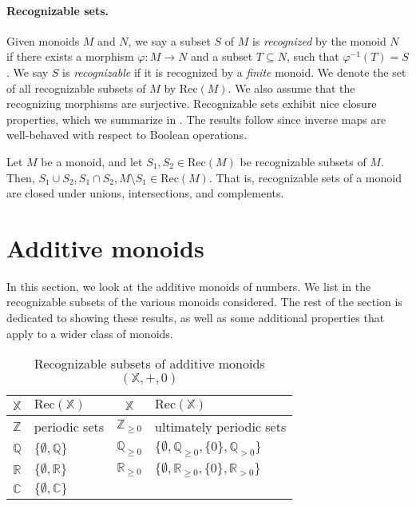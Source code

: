 \documentclass{llncs}
\begin{document}
\paragraph*{Recognizable sets.}
Given monoids $M$ and $N$, we say a subset $S$ of $M$ is \emph{recognized} by the monoid $N$ if there exists a morphism $\varphi \colon M \to N$ and a subset $T \subseteq N$, such that $\varphi^{-1}(T) = S$.
We say $S$ is \emph{recognizable} if it is recognized by a \emph{finite} monoid. 
We denote the set of all recognizable subsets of $M$ by $\text{Rec}(M)$.
We also assume that the recognizing morphisms are surjective.
Recognizable sets exhibit nice closure properties, which we summarize in .
The results follow since inverse maps are well-behaved with respect to Boolean operations.
\begin{proposition} 
    \label{prop:closure-properties-rec}
	Let $M$ be a monoid, and let $S_1, S_2 \in \text{Rec}(M)$ be recognizable subsets of $M$.
	Then, $S_1 \cup S_2, S_1 \cap S_2, M \setminus S_1 \in \text{Rec}(M)$.
	That is, recognizable sets of a monoid are closed under unions, intersections, and complements.
\end{proposition}

\section{Additive monoids} \label{sec:additive-monoids}

In this section, we look at the additive monoids of numbers. 
We list in  the recognizable subsets of the various monoids considered. 
The rest of the section is dedicated to showing these results, as well as some additional properties that apply to a wider class of monoids.

\begin{table}
  \centering
  \caption{Recognizable subsets of additive monoids \((\mathbb{X}, +, 0)\)}\label{tab:additive-monoids-results}
  \begin{tabular}{clcl}
    \hline
    \(\mathbb{X}\) & \(\text{Rec}(\mathbb{X})\) &\quad \(\mathbb{X}\) & \(\text{Rec}(\mathbb{X})\) \\\hline
    \(\mathbb{Z}\) & periodic sets &\quad \(\mathbb{Z}_{\ge 0}\) & ultimately periodic sets \\
    \(\mathbb{Q}\) & \(\{\emptyset, \mathbb{Q}\}\) &\quad \(\mathbb{Q}_{\ge 0}\) & \(\{\emptyset, \mathbb{Q}_{\geq 0}, \{0\}, \mathbb{Q}_{> 0}\}\)\\
    \(\mathbb{R}\) & \(\{\emptyset, \mathbb{R}\}\) &\quad \(\mathbb{R}_{\ge 0}\) & \(\{\emptyset, \mathbb{R}_{\geq 0}, \{0\}, \mathbb{R}_{> 0}\}\)\\
    \(\mathbb{C}\) & \(\{\emptyset, \mathbb{C}\}\)& & \\
    \hline
  \end{tabular}
\end{table}
\end{document}
